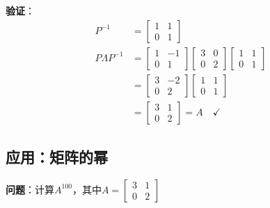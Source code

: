 \documentclass[12pt,a4paper]{article}
\begin{document}
\textbf{验证}：
\begin{align}
P^{-1} &= \begin{bmatrix} 1 & 1 \\ 0 & 1 \end{bmatrix} \\
P\Lambda P^{-1} &= \begin{bmatrix} 1 & -1 \\ 0 & 1 \end{bmatrix} \begin{bmatrix} 3 & 0 \\ 0 & 2 \end{bmatrix} \begin{bmatrix} 1 & 1 \\ 0 & 1 \end{bmatrix} \\
&= \begin{bmatrix} 3 & -2 \\ 0 & 2 \end{bmatrix} \begin{bmatrix} 1 & 1 \\ 0 & 1 \end{bmatrix} \\
&= \begin{bmatrix} 3 & 1 \\ 0 & 2 \end{bmatrix} = A \quad \checkmark
\end{align}

\subsection{应用：矩阵的幂}

\textbf{问题}：计算$A^{100}$，其中$A = \begin{bmatrix} 3 & 1 \\ 0 & 2 \end{bmatrix}$
\end{document}
